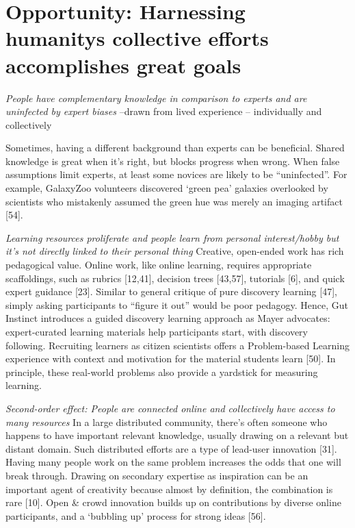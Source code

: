 \section{Opportunity: Harnessing humanity\textquotesingle s collective efforts accomplishes great goals}


\textit{People have complementary knowledge in comparison to experts and are uninfected by expert biases}
--drawn from lived experience
-- individually and collectively

Sometimes, having a different background than experts can
be beneficial. Shared knowledge is great when it’s right, but
blocks progress when wrong. When false assumptions limit
experts, at least some novices are likely to be “uninfected”.
For example, GalaxyZoo volunteers discovered ‘green pea’
galaxies overlooked by scientists who mistakenly assumed
the green hue was merely an imaging artifact [54]. 

\textit{Learning resources proliferate and people learn from personal interest/hobby but it's not directly linked to their personal thing}
Creative, open-ended work has rich pedagogical value.
Online work, like online learning, requires appropriate
scaffoldings, such as rubrics [12,41], decision trees [43,57],
tutorials [6], and quick expert guidance [23]. Similar to
general critique of pure discovery learning [47], simply
asking participants to “figure it out” would be poor pedagogy. Hence, Gut Instinct introduces a guided discovery
learning approach as Mayer advocates: expert-curated
learning materials help participants start, with discovery
following. Recruiting learners as citizen scientists offers a
Problem-based Learning experience with context and motivation for the material students learn [50]. In principle,
these real-world problems also provide a yardstick for
measuring learning. 

\textit{Second-order effect: People are connected online and collectively have access to many resources}
In a large distributed community, there’s often
someone who happens to have important relevant
knowledge, usually drawing on a relevant but distant domain. Such distributed efforts are a type of lead-user innovation [31]. Having many people work on the same problem increases the odds that one will break through. Drawing
on secondary expertise as inspiration can be an important
agent of creativity because almost by definition, the combination is rare [10]. Open \& crowd innovation builds up on
contributions by diverse online participants, and a ‘bubbling
up’ process for strong ideas [56].


